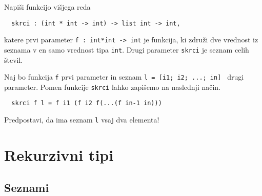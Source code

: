 \begin{ex} 
  Napi\v si funkcijo vi\v sjega reda

  \begin{verbatim}
  skrci : (int * int -> int) -> list int -> int,
  \end{verbatim}

  katere prvi parameter \texttt{f : int*int -> int} je funkcija, ki
  zdru\v zi dve vrednost iz seznama v en samo vrednost tipa
  \texttt{int}. Drugi parameter \texttt{skrci} je seznam celih \v
  stevil.

  Naj bo funkcija \texttt{f} prvi parameter in seznam \texttt{l = [i1;
    i2; ...; in] } drugi parameter. Pomen funkcije \texttt{skrci}
  lahko zapi\v semo na naslednji na\v cin.

  \begin{verbatim}
  skrci f l = f i1 (f i2 f(...(f in-1 in)))
  \end{verbatim}

  Predpostavi, da ima seznam \texttt{l} vsaj dva elementa!


\end{ex}

\section{Rekurzivni tipi}

\subsection{Seznami}

